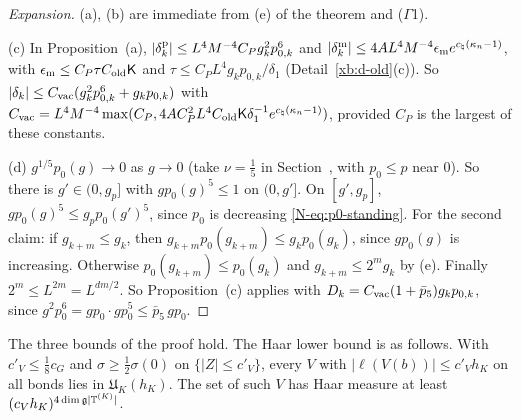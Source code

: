 \begin{proof}[Expansion]
(a), (b) are immediate from (e) of the theorem and ($\Gamma$1).

(c) In Proposition~(a), $|\delta^{\rm p}_k|\le L^4M^{-4}C_Pg_k^2p_{0,k}^6$ and $|\delta^{\rm m}_k|\le4AL^4M^{-4}\epsilon_{\rm m}e^{c_\natural(\kappa_n-1)}$, with $\epsilon_{\rm m}\le C_P\tau C_{\rm old}\mathsf K$ and $\tau\le C_PL^4g_kp_{0,k}/\delta_1$ (Detail~\ref{xb:d-old}(c)). So $|\delta_k|\le C_{\rm vac}(g_k^2p_{0,k}^6+g_kp_{0,k})$ with $C_{\rm vac}=L^4M^{-4}\max(C_P,4AC_P^2L^4C_{\rm old}\mathsf K\delta_1^{-1}e^{c_\natural(\kappa_n-1)})$, provided $C_P$ is the largest of these constants.

(d) $g^{1/5}p_0(g)\to0$ as $g\to0$ (take $\nu=\frac15$ in Section~, with $p_0\le p$ near $0$). So there is $g'\in(0,g_p]$ with $gp_0(g)^5\le1$ on $(0,g']$. On $[g',g_p]$, $gp_0(g)^5\le g_pp_0(g')^5$, since $p_0$ is decreasing \eqref{N-eq:p0-standing}. For the second claim: if $g_{k+m}\le g_k$, then $g_{k+m}p_0(g_{k+m})\le g_kp_0(g_k)$, since $gp_0(g)$ is increasing. Otherwise $p_0(g_{k+m})\le p_0(g_k)$ and $g_{k+m}\le2^mg_k$ by (e). Finally $2^m\le L^{2m}=L^{dm/2}$. So Proposition~(c) applies with $D_k=C_{\rm vac}(1+\bar p_5)g_kp_{0,k}$, since $g^2p_0^6=gp_0\cdot gp_0^5\le\bar p_5\,gp_0$.
\end{proof}

\begin{detail}\label{xb:d-stab}
The three bounds of the proof hold. The Haar lower bound is as follows. With $c'_V\le\frac18c_G$ and $\sigma\ge\frac12\sigma(0)$ on $\{|Z|\le c'_V\}$, every $V$ with $|\ell(V(b))|\le c'_Vh_K$ on all bonds lies in $\mathfrak U_K(h_K)$. The set of such $V$ has Haar measure at least $(c_Vh_K)^{4\dim\mathfrak g|\mathbb T^{(K)}|}$.
\end{detail}

